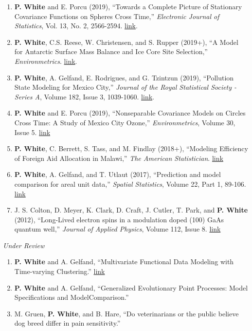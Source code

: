 \documentclass[12pt]{article}
\begin{document}
\begin{enumerate}[label=$\bullet$]
\item \textbf{P. White} and E. Porcu (2019), ``Towards a Complete Picture of Stationary Covariance Functions on Spheres Cross Time,'' \emph{Electronic Journal of Statistics}, Vol. 13, No. 2, 2566-2594. \href{https://doi.org/10.1214/19-EJS1593}{link}.
\item \textbf{P. White}, C.S. Reese, W. Christensen, and S. Rupper (2019+), ``A Model for Antarctic Surface Mass Balance and Ice Core Site Selection,'' \emph{Environmetrics}. \href{https://onlinelibrary.wiley.com/doi/abs/10.1002/env.2579}{link}.
\item \textbf{P. White}, A. Gelfand, E. Rodrigues, and G. Tzintzun (2019), ``Pollution State Modeling for Mexico City,'' \emph{Journal of the Royal Statistical Society - Series A}, Volume 182, Issue 3, 1039-1060. \href{https://rss.onlinelibrary.wiley.com/doi/abs/10.1111/rssa.12444}{link}.
\item \textbf{P. White} and E. Porcu (2019), ``Nonseparable Covariance Models on Circles Cross Time: A Study of Mexico City Ozone,'' \emph{Environmetrics}, Volume 30, Issue 5. \href{https://onlinelibrary.wiley.com/doi/full/10.1002/env.2558}{link}
\item \textbf{P. White}, C. Berrett, S. Tass, and M. Findlay (2018+), ``Modeling Efficiency of Foreign Aid Allocation in Malawi,'' \emph{The American Statistician}.  \href{https://www.tandfonline.com/doi/full/10.1080/00031305.2018.1470032}{link}
\item \textbf{P. White}, A. Gelfand, and T. Utlaut (2017), ``Prediction and model comparison for areal unit data,'' \emph{Spatial Statistics}, Volume 22, Part 1, 89-106. \href{http://www.sciencedirect.com/science/article/pii/S2211675317301422}{link}
\item J. S. Colton, D. Meyer, K. Clark, D. Craft, J. Cutler, T. Park, and \textbf{P. White} (2012), ``Long-Lived electron spins in a modulation doped (100) GaAs quantum well,'' \emph{Journal of Applied Physics}, Volume 112, Issue 8.  \href{http://aip.scitation.org/doi/abs/10.1063/1.4759320}{link}
\end{enumerate}

\emph{Under Review}

\begin{enumerate}[label=$\bullet$]
\item \textbf{P. White} and A. Gelfand, ``Multivariate Functional Data Modeling with Time-varying Clustering.'' \href{https://arxiv.org/abs/1904.11518}{link}
\item \textbf{P. White} and A. Gelfand, ``Generalized Evolutionary Point Processes: Model Specifications and ModelComparison.'' %
\item M. Gruen, \textbf{P. White}, and B. Hare, ``Do veterinarians or the public believe dog breed differ in pain sensitivity.''
\end{enumerate}
\end{document}
